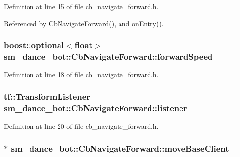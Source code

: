Definition at line 15 of file cb\+\_\+navigate\+\_\+forward.\+h.



Referenced by Cb\+Navigate\+Forward(), and on\+Entry().

\subsubsection[{\texorpdfstring{forward\+Speed}{forwardSpeed}}]{\setlength{\rightskip}{0pt plus 5cm}boost\+::optional$<$float$>$ sm\+\_\+dance\+\_\+bot\+::\+Cb\+Navigate\+Forward\+::forward\+Speed}\hypertarget{classsm__dance__bot_1_1CbNavigateForward_af6cff0d1fe09327ce56d35154cf0eb25}{}\label{classsm__dance__bot_1_1CbNavigateForward_af6cff0d1fe09327ce56d35154cf0eb25}


Definition at line 18 of file cb\+\_\+navigate\+\_\+forward.\+h.

\subsubsection[{\texorpdfstring{listener}{listener}}]{\setlength{\rightskip}{0pt plus 5cm}tf\+::\+Transform\+Listener sm\+\_\+dance\+\_\+bot\+::\+Cb\+Navigate\+Forward\+::listener}\hypertarget{classsm__dance__bot_1_1CbNavigateForward_a7bda457757f10a2e71eb15c07bf707b4}{}\label{classsm__dance__bot_1_1CbNavigateForward_a7bda457757f10a2e71eb15c07bf707b4}


Definition at line 20 of file cb\+\_\+navigate\+\_\+forward.\+h.

\subsubsection[{\texorpdfstring{move\+Base\+Client\+\_\+}{moveBaseClient_}}]{$\ast$ sm\+\_\+dance\+\_\+bot\+::\+Cb\+Navigate\+Forward\+::move\+Base\+Client\+\_\+}\hypertarget{classsm__dance__bot_1_1CbNavigateForward_aa1cd872e92fca83c44ff0430bda061a7}{}\label{classsm__dance__bot_1_1CbNavigateForward_aa1cd872e92fca83c44ff0430bda061a7}


